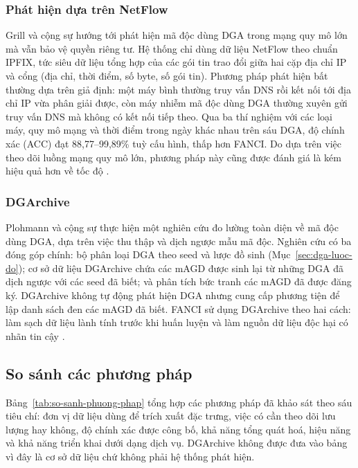 \subsubsection{Phát hiện dựa trên NetFlow}

Grill và cộng sự \cite{grill2015netflow} hướng tới phát hiện mã độc dùng DGA trong mạng quy mô lớn mà vẫn bảo vệ quyền riêng tư. Hệ thống chỉ dùng dữ liệu NetFlow theo chuẩn IPFIX, tức siêu dữ liệu tổng hợp của các gói tin trao đổi giữa hai cặp địa chỉ IP và cổng (địa chỉ, thời điểm, số byte, số gói tin). Phương pháp phát hiện bất thường dựa trên giả định: một máy bình thường truy vấn DNS rồi kết nối tới địa chỉ IP vừa phân giải được, còn máy nhiễm mã độc dùng DGA thường xuyên gửi truy vấn DNS mà không có kết nối tiếp theo. Qua ba thí nghiệm với các loại máy, quy mô mạng và thời điểm trong ngày khác nhau trên sáu DGA, độ chính xác (ACC) đạt 88,77--99,89\% tuỳ cấu hình, thấp hơn FANCI. Do dựa trên việc theo dõi luồng mạng quy mô lớn, phương pháp này cũng được đánh giá là kém hiệu quả hơn về tốc độ \cite{schuppen2018fanci}.

\subsubsection{DGArchive}

Plohmann và cộng sự \cite{plohmann2016dga} thực hiện một nghiên cứu đo lường toàn diện về mã độc dùng DGA, dựa trên việc thu thập và dịch ngược mẫu mã độc. Nghiên cứu có ba đóng góp chính: bộ phân loại DGA theo seed và lược đồ sinh (Mục~\ref{sec:dga-luoc-do}); cơ sở dữ liệu DGArchive \cite{dgarchive} chứa các mAGD được sinh lại từ những DGA đã dịch ngược với các seed đã biết; và phân tích bức tranh các mAGD đã được đăng ký. DGArchive không tự động phát hiện DGA nhưng cung cấp phương tiện để lập danh sách đen các mAGD đã biết. FANCI sử dụng DGArchive theo hai cách: làm sạch dữ liệu lành tính trước khi huấn luyện và làm nguồn dữ liệu độc hại có nhãn tin cậy \cite{schuppen2018fanci}.

\subsection{So sánh các phương pháp}\label{sec:so-sanh}

Bảng~\ref{tab:so-sanh-phuong-phap} tổng hợp các phương pháp đã khảo sát theo sáu tiêu chí: đơn vị dữ liệu dùng để trích xuất đặc trưng, việc có cần theo dõi lưu lượng hay không, độ chính xác được công bố, khả năng tổng quát hoá, hiệu năng và khả năng triển khai dưới dạng dịch vụ. DGArchive không được đưa vào bảng vì đây là cơ sở dữ liệu chứ không phải hệ thống phát hiện.

